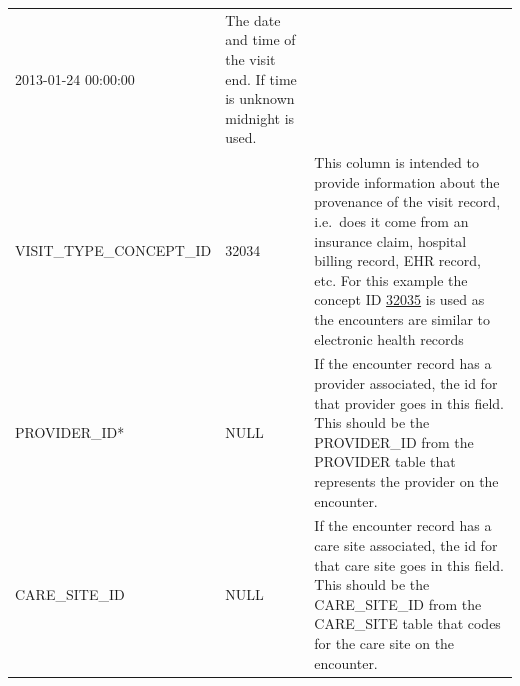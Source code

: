 \documentclass[]{book}
\begin{document}
\begin{longtable}[]{@{}lll@{}}
\begin{minipage}[t]{0.17\columnwidth}
2013-01-24 00:00:00\strut
\end{minipage} & \begin{minipage}[t]{0.49\columnwidth}\raggedright\strut
The date and time of the visit end. If time is unknown midnight is
used.\strut
\end{minipage}\tabularnewline
\begin{minipage}[t]{0.25\columnwidth}\raggedright\strut
VISIT\_TYPE\_CONCEPT\_ID\strut
\end{minipage} & \begin{minipage}[t]{0.17\columnwidth}\raggedright\strut
32034\strut
\end{minipage} & \begin{minipage}[t]{0.49\columnwidth}\raggedright\strut
This column is intended to provide information about the provenance of
the visit record, i.e.~does it come from an insurance claim, hospital
billing record, EHR record, etc. For this example the concept ID
\href{http://athena.ohdsi.org/search-terms/terms/32035}{32035} is used
as the encounters are similar to electronic health records\strut
\end{minipage}\tabularnewline
\begin{minipage}[t]{0.25\columnwidth}\raggedright\strut
PROVIDER\_ID*\strut
\end{minipage} & \begin{minipage}[t]{0.17\columnwidth}\raggedright\strut
NULL\strut
\end{minipage} & \begin{minipage}[t]{0.49\columnwidth}\raggedright\strut
If the encounter record has a provider associated, the id for that
provider goes in this field. This should be the PROVIDER\_ID from the
PROVIDER table that represents the provider on the encounter.\strut
\end{minipage}\tabularnewline
\begin{minipage}[t]{0.25\columnwidth}\raggedright\strut
CARE\_SITE\_ID\strut
\end{minipage} & \begin{minipage}[t]{0.17\columnwidth}\raggedright\strut
NULL\strut
\end{minipage} & \begin{minipage}[t]{0.49\columnwidth}\raggedright\strut
If the encounter record has a care site associated, the id for that care
site goes in this field. This should be the CARE\_SITE\_ID from the
CARE\_SITE table that codes for the care site on the encounter.\strut
\end{minipage}\tabularnewline

\end{longtable}
\end{document}
